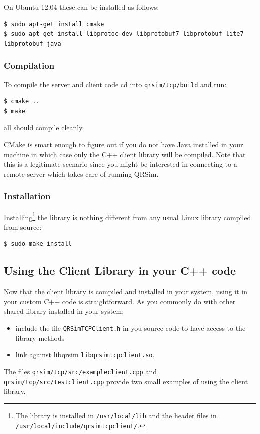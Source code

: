 \documentclass[a4paper,11pt]{report}
\begin{document}
On Ubuntu 12.04 these can be installed as follows:
\begin{verbatim}
$ sudo apt-get install cmake
$ sudo apt-get install libprotoc-dev libprotobuf7 libprotobuf-lite7 libprotobuf-java
\end{verbatim}

\subsubsection{Compilation} \label{comp}
To compile the server and client code cd into \texttt{qrsim/tcp/build} and run:
 \begin{verbatim}
$ cmake ..
$ make
\end{verbatim}
all should compile cleanly.

CMake is smart enough to figure out if you do not have Java installed in your machine in which case only the C++ client library will be compiled.
Note that this is a legitimate scenario since you might be interested in connecting to a remote server which takes care of running QRSim. 

\subsubsection{Installation}\label{inst}
Installing\footnote{The library is installed in \texttt{/usr/local/lib} and the header files in \texttt{/usr/local/include/qrsimtcpclient/}.} the library is nothing different from any usual Linux library compiled from source:

\begin{verbatim}
$ sudo make install
\end{verbatim}

\subsection{Using the Client Library in your C++ code}

Now that the client library is compiled and installed in your system, using it in your custom C++ code is straightforward.
As you commonly do with other shared library installed in your system:
\begin{itemize}
\item include the file \texttt{QRSimTCPClient.h} in you source code to have access to the library methods
\item link against libqrsim \texttt{libqrsimtcpclient.so}.
\end{itemize}
The files \texttt{qrsim/tcp/src/exampleclient.cpp} and \texttt{qrsim/tcp/src/testclient.cpp} provide two small examples of using the client library.
\end{document}
